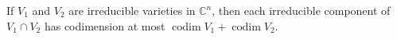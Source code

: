 If $V_1$ and $V_2$ are irreducible varieties in $\mathbb{C}^n$, then each irreducible component of $V_1 \cap V_2$ has codimension at most $\operatorname{codim} V_1 + \operatorname{codim} V_2$.
